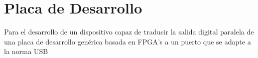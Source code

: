 \chapter{Placa de Desarrollo}
	Para el desarrollo de un dispositivo capaz de traducir la salida digital paralela de una placa de desarrollo genérica basada en FPGA's a un puerto que se adapte a la norma USB
